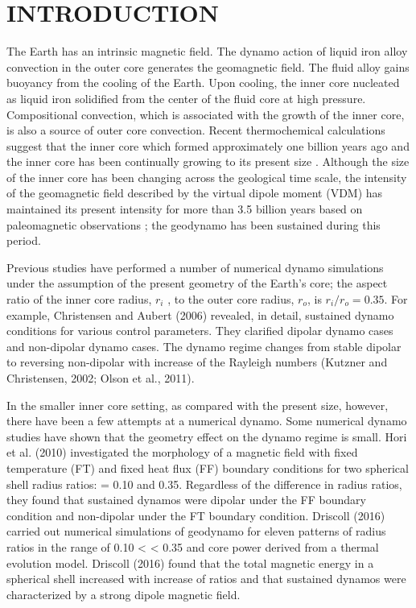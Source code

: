 \section{INTRODUCTION}
The Earth has an intrinsic magnetic field. The dynamo action of liquid iron alloy convection in the outer core generates the geomagnetic field. The fluid alloy gains buoyancy from the cooling of the Earth. Upon cooling, the inner core nucleated as liquid iron solidified from the center of the fluid core at high pressure. Compositional convection, which is associated with the growth of the inner core, is also a source of outer core convection. Recent thermochemical calculations suggest that the inner core which formed approximately one billion years ago and the inner core has been continually growing to its present size \cite{Labrosse:2001}. Although the size of the inner core has been changing across the geological time scale, the intensity of the geomagnetic field described by the virtual dipole moment (VDM) has maintained its present intensity for more than 3.5 billion years based on paleomagnetic observations \cite{Biggin:2015}; the geodynamo has been sustained during this period.

Previous studies have performed a number of numerical dynamo simulations under the assumption of the present geometry of the Earth’s core; the aspect ratio of the inner core radius, $r_{i}$ , to the outer core radius, $r_{o}$, is $r_{i} / r_{o}= 0.35$. For example, Christensen and Aubert (2006) revealed, in detail, sustained dynamo conditions for various control parameters. They clarified dipolar dynamo cases and non-dipolar dynamo cases. The dynamo regime changes from stable dipolar to reversing non-dipolar with increase of the Rayleigh numbers (Kutzner and Christensen, 2002; Olson et al., 2011).

In the smaller inner core setting, as compared with the present size, however, there have been a few attempts at a numerical dynamo. Some numerical dynamo studies have shown that the geometry effect on the dynamo regime is small. Hori et al. (2010) investigated the morphology of a magnetic field with fixed temperature (FT) and fixed heat flux (FF) boundary conditions for two spherical shell radius ratios: = 0.10 and 0.35. Regardless of the difference in radius ratios, they found that sustained dynamos were dipolar under the FF boundary condition and non-dipolar under the FT boundary condition. Driscoll (2016) carried out numerical simulations of geodynamo for eleven patterns of radius ratios in the range of 0.10 <  < 0.35 and core power derived from a thermal evolution model. Driscoll (2016) found that the total magnetic energy in a spherical shell increased with increase of  ratios and that sustained dynamos were characterized by a strong dipole magnetic field.

